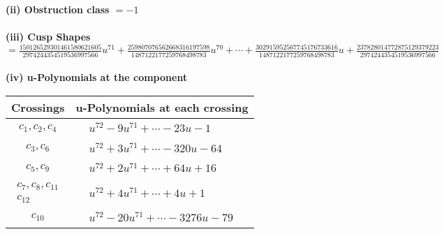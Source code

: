 \documentclass[1p]{elsarticle_modified}
\theoremstyle{definition}
\begin{document}
\flushleft \textbf{(ii) Obstruction class $= -1$}\\~\\
\flushleft \textbf{(iii) Cusp Shapes $= \frac{150126529301461580621605}{2974244354519536997566} u^{71}+\frac{259807076562668316197598}{1487122177259768498783} u^{70}+\cdots+\frac{302915952567745176733616}{1487122177259768498783} u+\frac{237828014772875129379223}{2974244354519536997566}$}\\~\\
\newpage\renewcommand{\arraystretch}{1}
\flushleft \textbf{(iv) u-Polynomials at the component}\newline \\
\begin{tabular}{m{50pt}|m{274pt}}
Crossings & \hspace{64pt}u-Polynomials at each crossing \\
\hline $$\begin{aligned}c_{1},c_{2},c_{4}\end{aligned}$$&$\begin{aligned}
&u^{72}-9 u^{71}+\cdots-23 u-1
\end{aligned}$\\
\hline $$\begin{aligned}c_{3},c_{6}\end{aligned}$$&$\begin{aligned}
&u^{72}+3 u^{71}+\cdots-320 u-64
\end{aligned}$\\
\hline $$\begin{aligned}c_{5},c_{9}\end{aligned}$$&$\begin{aligned}
&u^{72}+2 u^{71}+\cdots+64 u+16
\end{aligned}$\\
\hline $$\begin{aligned}c_{7},c_{8},c_{11}\\c_{12}\end{aligned}$$&$\begin{aligned}
&u^{72}+4 u^{71}+\cdots+4 u+1
\end{aligned}$\\
\hline $$\begin{aligned}c_{10}\end{aligned}$$&$\begin{aligned}
&u^{72}-20 u^{71}+\cdots-3276 u-79
\end{aligned}$\\
\hline
\end{tabular}\\~\\
\end{document}
